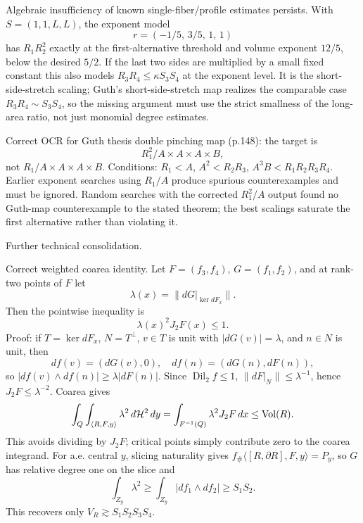 \documentclass[12pt]{article}
\newcommand{\Dil}{\operatorname{Dil}}
\newcommand{\Vol}{\operatorname{Vol}}
\begin{document}
Algebraic insufficiency of known single-fiber/profile estimates persists.  With
\(S=(1,1,L,L)\), the exponent model
\[
 r=(-1/5,\,3/5,\,1,\,1)
\]
has \(R_1R_2^2\) exactly at the first-alternative threshold and volume exponent
\(12/5\), below the desired \(5/2\).  If the last two sides are multiplied by a
small fixed constant this also models \(R_3R_4\le\kappa S_3S_4\) at the exponent
level.  It is the short-side-stretch scaling; Guth's short-side-stretch map realizes
the comparable case \(R_3R_4\sim S_3S_4\), so the missing argument must use the
strict smallness of the long-area ratio, not just monomial degree estimates.

Correct OCR for Guth thesis double pinching map (p.148): the target is
\[
 R_1^2/A \times A\times A\times B,
\]
not \(R_1/A\times A\times A\times B\).  Conditions:
\(R_1<A\), \(A^2<R_2R_3\), \(A^3B<R_1R_2R_3R_4\).  Earlier exponent searches
using \(R_1/A\) produce spurious counterexamples and must be ignored.  Random
searches with the corrected \(R_1^2/A\) output found no Guth-map counterexample
to the stated theorem; the best scalings saturate the first alternative rather than
violating it.




Further technical consolidation.

Correct weighted coarea identity.  Let \(F=(f_3,f_4)\), \(G=(f_1,f_2)\), and at
rank-two points of \(F\) let
\[
\lambda(x)=\|dG|_{\ker dF_x}\|.
\]
Then the pointwise inequality is
\[
 \lambda(x)^2 J_2F(x)\le 1.
\]
Proof: if \(T=\ker dF_x\), \(N=T^\perp\), \(v\in T\) is unit with
\(|dG(v)|=\lambda\), and \(n\in N\) is unit, then
\[
df(v)=(dG(v),0),\quad df(n)=(dG(n),dF(n)),
\]
so \(|df(v)\wedge df(n)|\ge \lambda |dF(n)|\).  Since \(\Dil_2 f\le1\),
\(\|dF|_N\|\le\lambda^{-1}\), hence \(J_2F\le\lambda^{-2}\).  Coarea gives
\[
\int_Q\int_{\langle R,F,y\rangle}\lambda^2\,d{\cal H}^2\,dy
=\int_{F^{-1}(Q)}\lambda^2J_2F\,dx\le \Vol(R).
\]
This avoids dividing by \(J_2F\); critical points simply contribute zero to the
coarea integrand.  For a.e. central \(y\), slicing naturality gives
\(f_\#\langle [R,\partial R],F,y\rangle=P_y\), so \(G\) has relative degree one on
the slice and
\[
\int_{Z_y}\lambda^2\ge \int_{Z_y}|df_1\wedge df_2|\ge S_1S_2.
\]
This recovers only \(V_R\gtrsim S_1S_2S_3S_4\).
\end{document}
